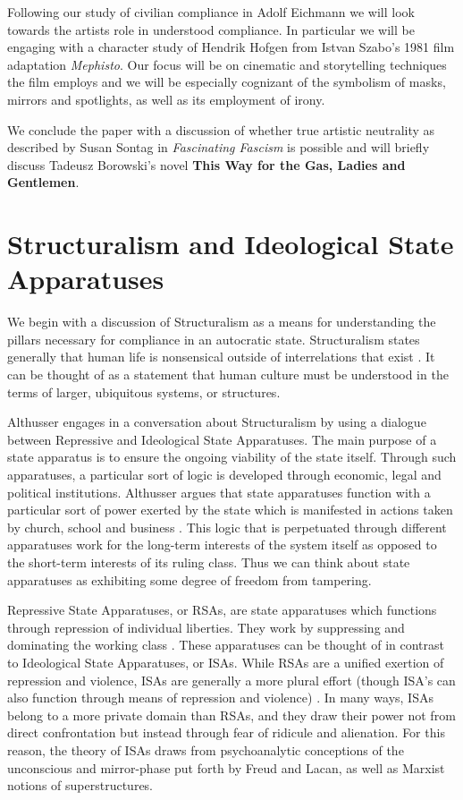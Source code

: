 \documentclass[a4paper, 11pt]{article} %
\begin{document}
Following our study of civilian compliance in Adolf Eichmann we will look towards the artists role in understood compliance.  In particular we will be engaging with a character study of Hendrik Hofgen from Istvan Szabo's 1981 film adaptation \textit{Mephisto}.  Our focus will be on cinematic and storytelling techniques the film employs and we will be especially cognizant of the symbolism of masks, mirrors and spotlights, as well as its employment of irony.    

We conclude the paper with a discussion of whether true artistic neutrality as described by Susan Sontag in \textit{Fascinating Fascism} is possible and will briefly discuss Tadeusz Borowski's novel \textbf{This Way for the Gas, Ladies and Gentlemen}.   


\section*{Structuralism and Ideological State Apparatuses}

We begin with a discussion of Structuralism as a means for understanding the pillars necessary for compliance in an autocratic state.  Structuralism states generally that human life is nonsensical outside of interrelations that exist \cite{Althusser}.  It can be thought of as a statement that human culture must be understood in the terms of larger, ubiquitous systems, or structures. 

Althusser engages in a conversation about Structuralism by using a dialogue between Repressive and Ideological State Apparatuses.  The main purpose of a state apparatus is to ensure the ongoing viability of the state itself.  Through such apparatuses, a particular sort of logic is developed through economic, legal and political institutions.  Althusser argues that state apparatuses function with a particular sort of power exerted by the state which is manifested in actions taken by church, school and business \cite{Althusser}.  This logic that is perpetuated through different apparatuses work for the long-term interests of the system itself as opposed to the short-term interests of its ruling class.  Thus we can think about state apparatuses as exhibiting some degree of freedom from tampering.  

Repressive State Apparatuses, or RSAs, are state apparatuses which functions through repression of individual liberties.  They work by suppressing and dominating the working class \cite{Lecture3}.  These  apparatuses can be thought of in contrast to Ideological State Apparatuses, or ISAs.  While RSAs are a unified exertion of repression and violence, ISAs are generally a more plural effort (though ISA's can also function through means of repression and violence) \cite{Lecture3}.  In many ways, ISAs belong to a more private domain than RSAs, and they draw their power not from direct confrontation but instead through fear of ridicule and alienation.  For this reason, the theory of ISAs draws from psychoanalytic conceptions of the unconscious and mirror-phase put forth by Freud and Lacan, as well as Marxist notions of superstructures.  
\end{document}
